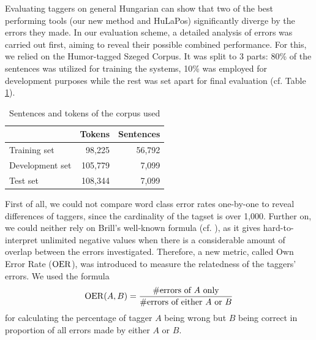 Evaluating taggers on general Hungarian can show that two of the best performing tools (our new method and HuLaPos) significantly diverge by the errors they made.
In our evaluation scheme, a detailed analysis of errors was carried out first, aiming to reveal their possible combined performance.
For this, we relied on the Humor-tagged Szeged Corpus.
It was split to 3 parts: 80\% of the sentences was utilized for training the systems, 10\% was employed for development purposes while the rest was set apart for final evaluation (cf. Table \ref{tab:comb-data}).

\begin{table}[H]
\centering
\caption{Sentences and tokens of the corpus used}\label{tab:comb-data}
\begin{tabular}{l r r}
\hline
& Tokens & Sentences \\
\hline
Training set & 98,225 & 56,792\\
Development set & 105,779 & 7,099 \\
Test set & 108,344 & 7,099 \\
\hline
\end{tabular}
\end{table}

First of all, we could not compare word class error rates one-by-one to reveal differences of taggers, since the cardinality of the tagset is over 1,000.
Further on, we could neither rely on Brill's well-known formula (cf. \cite{Brill1998}), as it gives hard-to-interpret unlimited negative values when there is a considerable amount of overlap between the errors investigated.
Therefore, a new metric, called Own Error Rate ($\operatorname{OER}$), was introduced to measure the relatedness of the taggers' errors.
We used the formula 
\begin{equation}
\operatorname{OER}(A,B)=\frac{\text{\#errors of }A\text{ only}}{\text{\#errors of either }A\text{ or }B}
\end{equation}
for calculating the percentage of tagger $A$ being wrong but $B$ being correct in proportion of all errors made by either $A$ or $B$.

